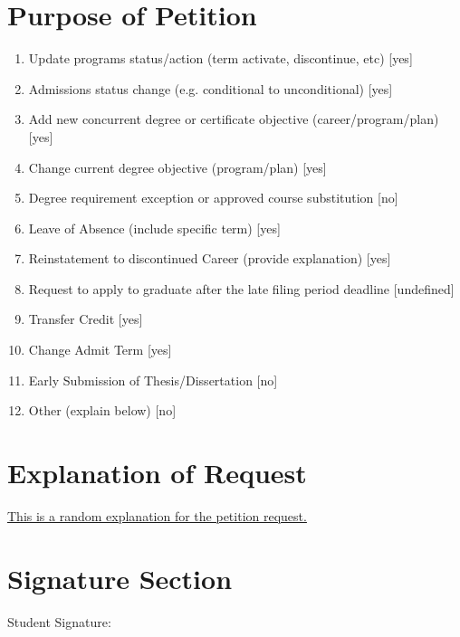 \documentclass[a4paper,12pt]{article}
\begin{document}
    \section*{Purpose of Petition}
    \begin{enumerate}
        \item Update programs status/action (term activate, discontinue, etc) \hfill [yes]
        \item Admissions status change (e.g. conditional to unconditional) \hfill [yes]
        \item Add new concurrent degree or certificate objective (career/program/plan) \hfill [yes]
        \item Change current degree objective (program/plan) \hfill [yes]
        \item Degree requirement exception or approved course substitution \hfill [no]
        \item Leave of Absence (include specific term) \hfill [yes]
        \item Reinstatement to discontinued Career (provide explanation) \hfill [yes]
        \item Request to apply to graduate after the late filing period deadline \hfill [undefined]
        \item Transfer Credit \hfill [yes]
        \item Change Admit Term \hfill [yes]
        \item Early Submission of Thesis/Dissertation \hfill [no]
        \item Other (explain below) \hfill [no]
    \end{enumerate}
    
    \section*{Explanation of Request}
    \begin{flushleft}
    \underline{\hspace{15cm} This is a random explanation for the petition request.} \\
    \end{flushleft}
    
    \section*{Signature Section}
    Student Signature: \underline{\hspace{7cm}}
    
    
\end{document}
